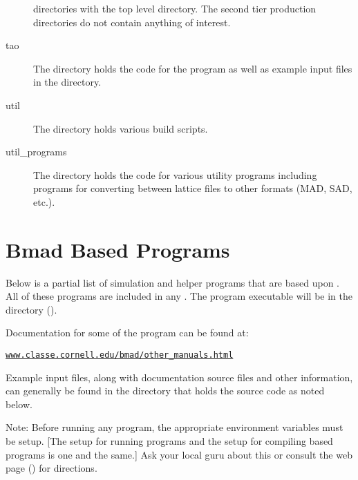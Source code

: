 \documentclass{hitec}     %
\newcommand{\Section}[1]{\section{#1}\vspace*{-1ex}}
\newenvironment{display}
  {\vspace*{-1.5ex} \begin{alltt}}
  {\end{alltt} \vspace*{-1.0ex}}
\begin{document}
\begin{description}
directories with the top level  directory. The second tier production directories do
not contain anything of interest.
%
\vspace{-0.4 ex}
\item[tao] \Newline
The  directory holds the code for the \tao program as well as example input
files in the  directory.
%
\vspace{-0.4 ex}
\item[util] \Newline
The  directory holds various build scripts.
%
\vspace{-0.4 ex}
\item[util_programs] \Newline
The  directory holds the code for various utility programs including programs for
converting between \bmad lattice files to other formats (MAD, SAD, etc.).

\end{description}

\newpage

\Section{Bmad Based Programs}
\label{s:programs}

Below is a partial list of simulation and helper programs that are based upon \bmad. All of these
programs are included in any . The program executable will be in
the  directory ().

Documentation for some of the program can be found at:
\begin{display}
  \url{www.classe.cornell.edu/bmad/other_manuals.html}
\end{display}
Example input files, along with documentation source files and other information, can generally be
found in the directory that holds the source code as noted below.

Note: Before running any program, the appropriate environment variables must be setup. [The setup
for running programs and the setup for compiling \bmad based programs is one and the same.] Ask your
local \bmad guru about this or consult the \bmad web page () for directions.
\end{document}
